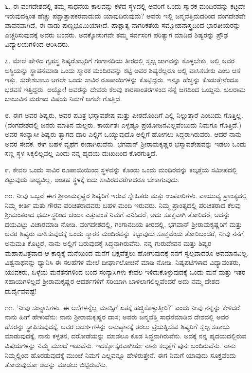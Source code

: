  ೬. ಈ ವಂಗದೇಶದಲ್ಲಿ ತಮ್ಮ ಸಾಧನೆಯ ಕಾಲವನ್ನು ಕಳೆದ ಸ್ಥಳದಲ್ಲಿ ಅವರಿಗೆ ಒಂದು ಸ್ಮಾರಕ ಮಂದಿರವನ್ನು ಕಟ್ಟದೇ ಇರುವುದಕ್ಕಿಂತ ಹೆಚ್ಚು ಪಶ್ಚಾತ್ತಾಪಕರವಾದುದು ಯಾವುದಿರುವುದು? ಅವರು ಇಲ್ಲಿ ಜನ್ಮವೆತ್ತಿದುದರಿಂದ ವಂಗದೇಶವೇ ಪಾವನವಾಗಿದೆ, ಈ ನಾಡು ಪುಣ್ಯಭೂಮಿಯಾಗಿದೆ. ಪಾಶ್ಚಾತ್ಯ ನಾಗರಿಕತೆಯ ಸಮ್ಮೋಹನಾಸ್ತ್ರದಿಂದ ಭಾರತೀಯರನ್ನು ಎಚ್ಚರಿಸುವುದಕ್ಕೆ ಅವರು ಬಂದರು. ಅದಕ್ಕೋಸುಗವೇ ತಮ್ಮ ಸರ್ವಸಂಗ ಪರಿತ್ಯಾಗ ಮಾಡಿದ ಶಿಷ್ಯರನ್ನು ಪ್ರೌಢ ವಿದ್ಯಾಲಯಗಳಿಂದ ಆರಿಸಿದರು. 

 ೭. ಮೇಲೆ ಹೇಳಿದ ಗೃಹಸ್ಥ ಶಿಷ್ಯರೊಬ್ಬರಿಗೆ ಗಂಗಾನದಿಯ ತೀರದಲ್ಲಿ ಸ್ವಲ್ಪ ಜಾಗವನ್ನು ಕೊಳ್ಳಬೇಕು, ಅಲ್ಲಿ ಅವರ ಅಸ್ಥಿಯನ್ನು ಸ್ಥಾಪನೆಮಾಡಿ ಒಂದು ಸ್ಮಾರಕ ಮಂದಿರವನ್ನು ಕಟ್ಟಿ ಅವರ ಶಿಷ್ಯರೆಲ್ಲರೂ ಅಲ್ಲಿ ವಾಸಿಸಬೇಕು ಎಂಬ ಆಸೆ ಇತ್ತು. ಸುರೇಶಬಾಬು ಆಗಲೇ ಒಂದು ಸಾವಿರ ರೂಪಾಯಿಗಳನ್ನು ಕೊಟ್ಟಿದ್ದರು. ಇನ್ನೂ ಹೆಚ್ಚನ್ನು ಕೊಡುತ್ತೇನೆಂದೂ ಭರವಸೆ ಇತ್ತಿದ್ದರು. ಅಯ್ಯೋ! ಅವರನ್ನು ದೇವರು ಕೆಲವು ಕಾರಣಾಂತರಗಳಿಂದ ನೆನ್ನೆ ಜಗದಿಂದ ಒಯ್ದನು. ಬಲರಾಮ ಬಾಬುವಿನ ಮರಣದ ವಿಷಯ ನಿಮಗೆ ಆಗಲೇ ಗೊತ್ತಿದೆ. 

 ೮. ಈಗ ಅವರ ಶಿಷ್ಯರು, ಅವರ ಪವಿತ್ರ ಭಸ್ಮಾವಶೇಷ ಮತ್ತು ಪೀಠದೊಂದಿಗೆ ಎಲ್ಲಿ ನಿಲ್ಲುತ್ತಾರೆ ಎಂಬುದು ಗೊತ್ತಿಲ್ಲ. (ವಂಗದೇಶದಲ್ಲಿ ಜನರು ಮಾತಿನ ಮಲ್ಲರು. ಕಾರ್ಯತಃ ಎಳ್ಳಷ್ಟೂ ಪ್ರಯೋಜನವಿಲ್ಲವೆಂಬುದು ನಿಮಗೂ ಗೊತ್ತಿದೆ.) ಅವರ ಸಂನ್ಯಾಸೀ ಶಿಷ್ಯರು ತ್ಯಾಗದ ದಾರಿ ಎಲ್ಲಿಗೆ ಒಯ್ಯುವುದೊ ಅಲ್ಲಿಗೆ ಹೋಗಲು ಸಿದ್ಧರಾಗಿರುವರು. ಆದರೆ ನಾನು ಅವರ ಸೇವಕ. ಈಗ ಬಹಳ ವ್ಯಥೆಗೆ ಈಡಾಗಿರುವೆನು. ಭಗವಾನ್ ಶ‍್ರೀರಾಮಕೃಷ್ಣರ ಭಸ್ಮಾವಶೇಷವನ್ನು ಇಡಲು ಒಂದು ಸಣ್ಣ ಸ್ಥಳ ಸಿಕ್ಕಲಿಲ್ಲವಲ್ಲ ಎಂದು ನನ್ನ ಹೃದಯ ದುಃಖದಿಂದ ಕೊರಗುತ್ತಿದೆ. 

 ೯. ಕೇವಲ ಒಂದು ಸಾವಿರ ರೂಪಾಯಿಯಿಂದ ಸ್ಥಳವನ್ನು ಕೊಂಡು ಒಂದು ಮಂದಿರವನ್ನು ಕಲ್ಕತ್ತೆಯ ಸಮೀಪದಲ್ಲಿ ಕಟ್ಟುವುದು ಸಾಧ್ಯವಿಲ್ಲ. ಅಂತಹ ಸ್ಥಳಕ್ಕೆ ಐದು ಸಾವಿರದವರೆಗಾದರೂ ಬೇಕಾಗುವುದು. 

 ೧೦. ನೀವು ಒಬ್ಬರೆ ಈಗ ಶ‍್ರೀರಾಮಕೃಷ್ಣರ ಶಿಷ್ಯರಿಗೆ ಇರುವ ಸ್ನೇಹಿತರು ಮತ್ತು ಉಪಕಾರಿಗಳು. ವಾಯುವ್ಯ ಪ್ರಾಂತ್ಯದಲ್ಲಿ ನಿಮ್ಮ ಕೀರ್ತಿ ಮತು ಗೌರವ ಪರಿಚಿತರಾದವರು ಬಹಳ ಮಂದಿ ಇರುವರು. ನಿಮ್ಮ ಪ್ರಾಂತ್ಯದಲ್ಲಿ ಪರಿಚಿತರಾದ ಕೆಲವು ಶ‍್ರೀಮಂತರಾದ ಧರ್ಮಸ್ಥರಿಂದ ಚಂದಾ ಎತ್ತುವಂತೆ ನಿಮಗೆ ಎನಿಸಿದರೆ, ಅದು ಸೂಕ್ತವಾಗಿ ತೋರಿದರೆ, ಅದನ್ನು ದಯವಿಟ್ಟು ವಿಚಾರಮಾಡಿ ನೋಡಿ. ವಂಗದೇಶದಲ್ಲಿ, ಗಂಗಾನದಿಯ ತೀರದಲ್ಲಿ, ಭಗವಾನ್ ಶ‍್ರೀರಾಮಕೃಷ್ಣರಿಗೆ ಮತ್ತು ಅವರ ಶಿಷ್ಯರು ವಾಸಿಸುವುದಕ್ಕೆ ಒಂದು ಸ್ಮಾರಕ ಮಂದಿರವನ್ನು ಕಟ್ಟುವುದು ಸೂಕ್ತವೆಂದು ತೋರಿಬಂದರೆ, ನೀವು ನನಗೆ ಅನುಮತಿ ಕೊಟ್ಟರೆ, ನಾನು ಅಲ್ಲಿಗೆ ಬರುವುದಕ್ಕೆ ಸಿದ್ಧನಾಗಿರುವೆನು. ನನ್ನ ಗುರುದೇವನ ಮತ್ತು ಶಿಷ್ಯರ ಮಹಾಪವಿತ್ರವಾದ ಆ ಕಾರ‍್ಯಕ್ಕೆ ಮನೆಯಿಂದ ಮನೆಗೆ ಭಿಕ್ಷವೆತ್ತಲು ಹೋಗುವುದಕ್ಕೆ ನನಗೆ ಸ್ವಲ್ಪವಾದರೂ ಅವಮಾನವಿಲ್ಲ. ವಿಶ್ವನಾಥನನ್ನು ಧ್ಯಾನಿಸಿ ಈ ಸಲಹೆಗಳ ಮೇಲೆ ದೀರ್ಘಾಲೋಚನೆ ಮಾಡಿ ನೋಡಿ. ನಿಷ್ಕಪಟಿಗಳಾದ ವಿದ್ಯಾವಂತರು, ಯುವಕರು, ಒಳ್ಳೆಯ ಮನೆತನಗಳಿಂದ ಬಂದ ಸಂನ್ಯಾಸಿಗಳು ಕೇವಲ ಇಳಿದುಕೊಳ್ಳುವುದಕ್ಕೆ ಒಂದು ಮನೆ ಮತ್ತು ಇತರ ಸಹಾಯಗಳಿಲ್ಲದೆ ಶ‍್ರೀರಾಮಕೃಷ್ಣರ ಆದರ್ಶಗಳಿಗೆ ಸರಿಯಾಗಿ ಬಾಳಲಾಗಲಿಲ್ಲವೆಂದರೆ ಅದು ನಮ್ಮ ದೇಶದ ದುರ್ದೈವವಷ್ಟೆ!

 ೧೧. ‘ನೀವು ಸಂನ್ಯಾಸಿಗಳು. ಈ ಆಸೆಗಳನ್ನೆಲ್ಲ ಮನಸ್ಸಿಗೆ ಏತಕ್ಕೆ ಹಚ್ಚಿಕೊಳ್ಳುತ್ತೀರಿ?’ ಎಂದು ನೀವು ನನ್ನನ್ನು ಕೇಳಿದರೆ ನಾನು ಹೀಗೆ ಹೇಳುವೆನು: ನಾನು ಶ‍್ರೀರಾಮಕೃಷ್ಣರ ದಾಸ; ಅವರು ಜನ್ಮವೆತ್ತಿ ಸಾಧನೆಮಾಡಿದ ದೇಶದಲ್ಲಿ ಅವರ ಹೆಸರನ್ನು ಸ್ಥಾಪಿಸುವುದಕ್ಕೆ, ಅವರ ಆದರ್ಶಗಳನ್ನು ಅನುಷ್ಠಾನಕ್ಕೆ ತರಲು ಪ್ರಯತ್ನಿಸುವ ಶಿಷ್ಯರಿಗೆ ಸ್ವಲ್ಪ ಸಹಾಯ ಮಾಡುವುದಕ್ಕೆ, ನಾನು ಕಳ್ಳತನ, ದರೋಡೆಯನ್ನು ಮಾಡಲೂ ಕೂಡ ಸಿದ್ಧನಾಗಿರುವೆನು. ಅದಕ್ಕೆ ನನ್ನ ಹೃದಯದಲ್ಲಿರುವ ವಿಷಯಗಳನ್ನು ನಿಮ್ಮ ಮುಂದೆ ಇಡುವೆನು. ಇದಕ್ಕೋಸ್ಕರವಾಗಿಯೇ ನಾನು ಕಲ್ಕತ್ತೆಗೆ ಪುನಃ ಬಂದಿರುವೆನು. ನಾನು ನಿಮ್ಮಲ್ಲಿಂದ ಹೊರಡುವುದಕ್ಕೆ ಮುಂಚೆ ನಿಮಗೆ ಎಲ್ಲವನ್ನೂ ಹೇಳಿರುತ್ತೇನೆ. ಈಗ ನಿಮಗೆ ಯಾವುದು ಸೂಕ್ತವೆಂದು ತೋರುವುದೋ ಅದನ್ನು ಮಾಡಲು ಬಿಟ್ಟಿರುವೆನು. 

